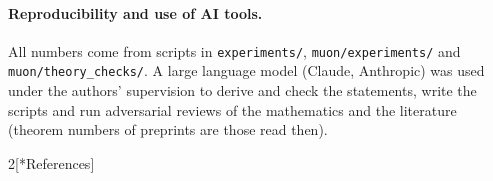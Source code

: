 \documentclass[10pt]{article}
\makeatletter
\renewcommand\section{\@startsection{section}{1}{\z@}{-2.4ex \@plus -0.6ex \@minus -.2ex}{1.2ex \@plus .2ex}{\normalfont\large\bfseries}}
\makeatother
\begin{document}
\paragraph{Reproducibility and use of AI tools.} All numbers come from scripts in \nolinkurl{experiments/},
\nolinkurl{muon/experiments/} and \nolinkurl{muon/theory_checks/}. A large language model (Claude, Anthropic) was used
under the authors' supervision to derive and check the statements, write the scripts and run adversarial reviews of
the mathematics and the literature (theorem numbers of preprints are those read then).

{\footnotesize\setlength{\columnsep}{1.6em}
\begin{multicols}{2}[\section*{References}]
\sloppy


\end{multicols}
}
\end{document}
